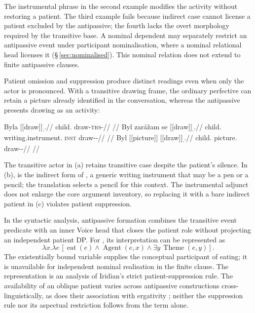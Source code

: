 The instrumental phrase in the second example modifies the activity without
restoring a patient. The third example fails because indirect case cannot
license a patient excluded by the antipassive; the fourth lacks the overt
morphology required by the transitive base. A nominal dependent may separately
restrict an antipassive event under participant nominalisation, where a nominal
relational head licenses it (§\,\ref{sec:nominalised}). This nominal relation
does not extend to finite antipassive clauses.


Patient omission and suppression produce distinct readings even when only
the actor is pronounced. With a transitive drawing frame, the ordinary
perfective can retain a picture already identified in the conversation,
whereas the antipassive presents drawing as an activity:

\pex\label{ex:val-slot-antipassive}
\a
\begingl
\gla Byla \textnormal{[[draw]]}\textsubscript{\Trs{}.\Pf{}}.//
\glb child.\Trs{} draw-\textsc{trs}-\Pf{}//
\glft {}
//
\endgl
\a
\begingl
\gla Byl zarážam se \textnormal{[[draw]]}\textsubscript{\Antip{}.\Pf{}}.//
\glb child.\Dir{} writing.instrument.\Ind{} \textsc{inst} draw-\Antip{}-\Pf{}//
\glft {}
//
\endgl
\a
\begingl
\gla *Byl \textnormal{[[picture]]}\textsubscript{\Ind{}} \textnormal{[[draw]]}\textsubscript{\Antip{}.\Pf{}}.//
\glb child.\Dir{} picture.\Ind{} draw-\Antip{}-\Pf{}//
\glft {}
//
\endgl
\xe

The transitive actor in (a) retains transitive case despite the patient's
silence. In (b),  is the indirect form of ,
a generic writing instrument that may be a pen or a pencil; the translation
selects a pencil for this context. The instrumental adjunct does not enlarge
the core argument inventory, so replacing it with a bare indirect patient
in (c) violates patient suppression.

In the syntactic analysis, antipassive formation combines the transitive event predicate with an inner
Voice head that closes the patient role without projecting an independent
patient DP. For , its interpretation can be represented as
\[
 \lambda x.\lambda e\,[\operatorname{eat}(e)\land
 \operatorname{Agent}(e,x)\land
 \exists y\,\operatorname{Theme}(e,y)].
\]
The existentially bound variable supplies the conceptual participant of eating;
it is unavailable for independent nominal realisation in the finite clause.
The representation is an analysis of Iridian's strict patient-suppression rule.
The availability of an oblique patient varies across antipassive constructions
cross-linguistically, as does their association with ergativity
\cite{heaton2020}; neither the suppression rule nor its aspectual restriction
follows from the term  alone.

